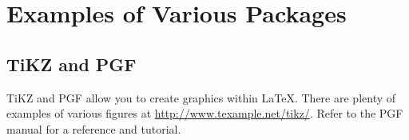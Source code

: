 \section*{Examples of Various Packages}

\subsection*{TiKZ and PGF}
TiKZ and PGF \citep{website:pgf} allow you to create graphics within \LaTeX.
There are plenty of examples of various figures at \url{http://www.texample.net/tikz/}.
Refer to the PGF \citep{manual:tikz_pgf} manual for a reference and tutorial.


\def\firstcircle{(0,0) circle (1.5cm)}
\def\secondcircle{(0:2cm) circle (1.5cm)}




